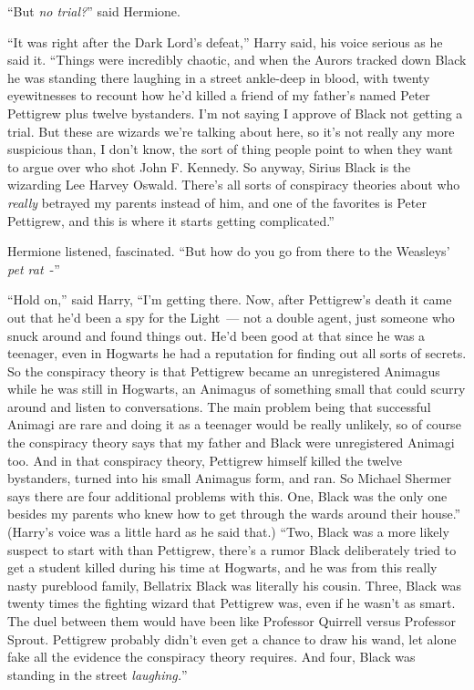 ``But \emph{no trial?}'' said Hermione.

``It was right after the Dark Lord's defeat,'' Harry said, his voice serious as he said it. ``Things were incredibly chaotic, and when the Aurors tracked down Black he was standing there laughing in a street ankle-deep in blood, with twenty eyewitnesses to recount how he'd killed a friend of my father's named Peter Pettigrew plus twelve bystanders. I'm not saying I approve of Black not getting a trial. But these are wizards we're talking about here, so it's not really any more suspicious than, I don't know, the sort of thing people point to when they want to argue over who shot John F. Kennedy. So anyway, Sirius Black is the wizarding Lee Harvey Oswald. There's all sorts of conspiracy theories about who \emph{really} betrayed my parents instead of him, and one of the favorites is Peter Pettigrew, and this is where it starts getting complicated.''

Hermione listened, fascinated. ``But how do you go from there to the Weasleys' \emph{pet rat}~-''

``Hold on,'' said Harry, ``I'm getting there. Now, after Pettigrew's death it came out that he'd been a spy for the Light~--- not a double agent, just someone who snuck around and found things out. He'd been good at that since he was a teenager, even in Hogwarts he had a reputation for finding out all sorts of secrets. So the conspiracy theory is that Pettigrew became an unregistered Animagus while he was still in Hogwarts, an Animagus of something small that could scurry around and listen to conversations. The main problem being that successful Animagi are rare and doing it as a teenager would be really unlikely, so of course the conspiracy theory says that my father and Black were unregistered Animagi too. And in that conspiracy theory, Pettigrew himself killed the twelve bystanders, turned into his small Animagus form, and ran. So Michael Shermer says there are four additional problems with this. One, Black was the only one besides my parents who knew how to get through the wards around their house.'' (Harry's voice was a little hard as he said that.) ``Two, Black was a more likely suspect to start with than Pettigrew, there's a rumor Black deliberately tried to get a student killed during his time at Hogwarts, and he was from this really nasty pureblood family, Bellatrix Black was literally his cousin. Three, Black was twenty times the fighting wizard that Pettigrew was, even if he wasn't as smart. The duel between them would have been like Professor Quirrell versus Professor Sprout. Pettigrew probably didn't even get a chance to draw his wand, let alone fake all the evidence the conspiracy theory requires. And four, Black was standing in the street \emph{laughing.}''

